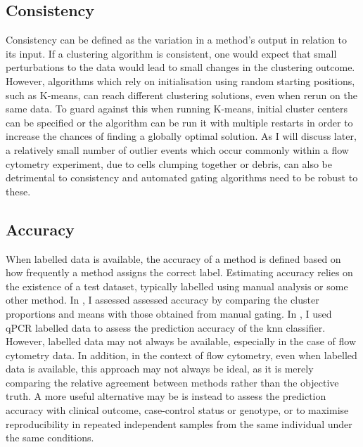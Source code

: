 \subsection{Consistency}
Consistency can be defined as the variation in a method's output in relation to its input.
If a clustering algorithm is consistent, one would expect that small perturbations to the data would lead to small changes in the clustering outcome.
However, algorithms which rely on initialisation using random starting positions, such as K-means, can reach different clustering solutions, even when rerun on the same data.
To guard against this when running K-means, initial cluster centers can be specified or the algorithm can be run it with multiple restarts in order to increase the chances of finding a globally optimal solution.
As I will discuss later, a relatively small number of outlier events which occur commonly within a flow cytometry experiment, due to cells clumping together or debris, can also be detrimental to consistency and automated gating algorithms need to be robust to these.

\subsection{Accuracy}
When labelled data is available, the accuracy of a method is defined based on how frequently a method assigns the correct label.
Estimating accuracy relies on the existence of a test dataset, typically labelled using manual analysis or some other method.
In , I assessed assessed accuracy by comparing the cluster proportions and means with those obtained from manual gating.
In , I used qPCR labelled data to assess the prediction accuracy of the \gls{knn} classifier.
However, labelled data may not always be available, especially in the case of flow cytometry data.
In addition, in the context of flow cytometry, even when labelled data is available, this approach may not always be ideal,
as it is merely comparing the relative agreement between methods rather than the objective truth.
A more useful alternative may be is instead to assess the prediction accuracy with clinical outcome, case-control status or genotype, or to maximise reproducibility in repeated independent samples from the same individual under the same conditions.

